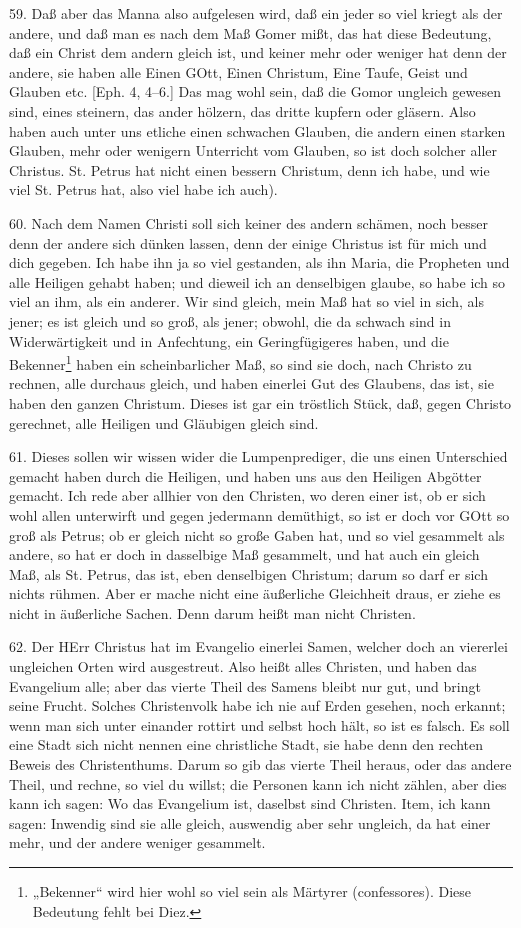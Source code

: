 59. Daß aber das Manna also aufgelesen wird, daß ein jeder so viel kriegt als der andere, und daß man es nach dem Maß Gomer mißt, das hat diese Bedeutung, daß ein Christ dem andern gleich ist, und keiner mehr oder weniger hat denn der andere, sie haben alle Einen GOtt, Einen Christum, Eine Taufe, Geist und Glauben etc. [Eph. 4, 4–6.] Das mag wohl sein, daß die Gomor ungleich gewesen sind, eines steinern, das ander hölzern, das dritte kupfern oder gläsern. Also haben auch unter uns etliche einen schwachen Glauben, die andern einen starken Glauben, mehr oder wenigern Unterricht vom Glauben, so ist doch solcher aller Christus. St. Petrus hat nicht einen bessern Christum, denn ich habe, und wie viel St. Petrus hat, also viel habe ich auch).

60. Nach dem Namen Christi soll sich keiner des andern schämen, noch besser denn der andere sich dünken lassen, denn der einige Christus ist für mich und dich gegeben. Ich habe ihn ja so viel gestanden, als ihn Maria, die Propheten und alle Heiligen gehabt haben; und dieweil ich an denselbigen glaube, so habe ich so viel an ihm, als ein anderer. Wir sind gleich, mein Maß hat so viel in sich, als jener; es ist gleich und so groß, als jener; obwohl, die da schwach sind in Widerwärtigkeit und in Anfechtung, ein Geringfügigeres haben, und die Bekenner\footnote{„Bekenner“ wird hier wohl so viel sein als Märtyrer (confessores). Diese Bedeutung fehlt bei Diez.} haben ein scheinbarlicher Maß, so sind sie doch, nach Christo zu rechnen, alle durchaus gleich, und haben einerlei Gut des Glaubens, das ist, sie haben den ganzen Christum. Dieses ist gar ein tröstlich Stück, daß, gegen Christo gerechnet, alle Heiligen und Gläubigen gleich sind.

61. Dieses sollen wir wissen wider die Lumpenprediger, die uns einen Unterschied gemacht haben durch die Heiligen, und haben uns aus den Heiligen Abgötter gemacht. Ich rede aber allhier von den Christen, wo deren einer ist, ob er sich wohl allen unterwirft und gegen jedermann demüthigt, so ist er doch vor GOtt so groß als Petrus; ob er gleich nicht so große Gaben hat, und so viel gesammelt als andere, so hat er doch in dasselbige Maß gesammelt, und hat auch ein gleich Maß, als St. Petrus, das ist, eben denselbigen Christum; darum so darf er sich nichts rühmen. Aber er mache nicht eine äußerliche Gleichheit draus, er ziehe es nicht in äußerliche Sachen. Denn darum heißt man nicht Christen.

62. Der HErr Christus hat im Evangelio einerlei Samen, welcher doch an viererlei ungleichen Orten wird ausgestreut. Also heißt alles Christen, und haben das Evangelium alle; aber das vierte Theil des Samens bleibt nur gut, und bringt seine Frucht. Solches Christenvolk habe ich nie auf Erden gesehen, noch erkannt; wenn man sich unter einander rottirt und selbst hoch hält, so ist es falsch. Es soll eine Stadt sich nicht nennen eine christliche Stadt, sie habe denn den rechten Beweis des Christenthums. Darum so gib das vierte Theil heraus, oder das andere Theil, und rechne, so viel du willst; die Personen kann ich nicht zählen, aber dies kann ich sagen: Wo das Evangelium ist, daselbst sind Christen. Item, ich kann sagen: Inwendig sind sie alle gleich, auswendig aber sehr ungleich, da hat einer mehr, und der andere weniger gesammelt.

